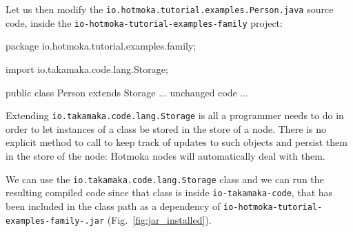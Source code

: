 Let us then modify the \texttt{io.hotmoka.tutorial.examples.Person.java}
source code, inside the \texttt{io-hotmoka-tutorial-examples-family} project:
%
\begin{codebox}\begin{javalst}
package io.hotmoka.tutorial.examples.family;

import io.takamaka.code.lang.Storage;

public class Person extends Storage {
  ... unchanged code ...
}
\end{javalst}\end{codebox}
%
\begin{commentbox}
  Extending \texttt{io.takamaka.code.lang.Storage}
  is all a programmer needs to do in order to let instances
  of a class be stored in the store of a node. There is no explicit method to call to keep track
  of updates to such objects and persist them in the store of the node:
  Hotmoka nodes will automatically deal with them.
\end{commentbox}
%
\begin{commentbox}
  We can use the \texttt{io.takamaka.code.lang.Storage} class
  and we can run the resulting compiled code
  since that class is inside \texttt{io-takamaka-code}, that has been included in the
  class path as a dependency of \texttt{io-hotmoka-tutorial-examples-family-\hotmokaVersion{}.jar}
  (Fig.~\ref{fig:jar_installed}).
\end{commentbox}

